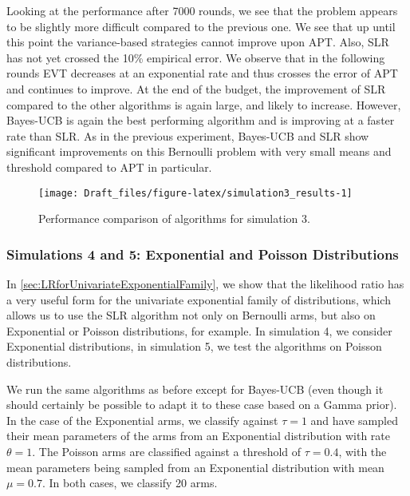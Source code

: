 \documentclass[11pt,]{article}
\begin{document}
Looking at the performance after 7000 rounds, we see that the problem
appears to be slightly more difficult compared to the previous one. We
see that up until this point the variance-based strategies cannot
improve upon APT. Also, SLR has not yet crossed the 10\% empirical
error. We observe that in the following rounds EVT decreases at an
exponential rate and thus crosses the error of APT and continues to
improve. At the end of the budget, the improvement of SLR compared to
the other algorithms is again large, and likely to increase. However,
Bayes-UCB is again the best performing algorithm and is improving at a
faster rate than SLR. As in the previous experiment, Bayes-UCB and SLR
show significant improvements on this Bernoulli problem with very small
means and threshold compared to APT in particular.

\begin{figure}

{\centering \texttt{[image: Draft\_files/figure-latex/simulation3\_results-1]} 

}

\caption{Performance comparison of algorithms for simulation 3.}\label{fig:simulation3_results}
\end{figure}

\subsubsection{Simulations 4 and 5: Exponential and Poisson
Distributions}\label{simulations-4-and-5-exponential-and-poisson-distributions}

In \autoref{sec:LRforUnivariateExponentialFamily}, we show that the
likelihood ratio has a very useful form for the univariate exponential
family of distributions, which allows us to use the SLR algorithm not
only on Bernoulli arms, but also on Exponential or Poisson
distributions, for example. In simulation 4, we consider Exponential
distributions, in simulation 5, we test the algorithms on Poisson
distributions.

We run the same algorithms as before except for Bayes-UCB (even though
it should certainly be possible to adapt it to these case based on a
Gamma prior). In the case of the Exponential arms, we classify against
\(\tau = 1\) and have sampled their mean parameters of the arms from an
Exponential distribution with rate \(\theta = 1\). The Poisson arms are
classified against a threshold of \(\tau = 0.4\), with the mean
parameters being sampled from an Exponential distribution with mean
\(\mu = 0.7\). In both cases, we classify 20 arms.
\end{document}
